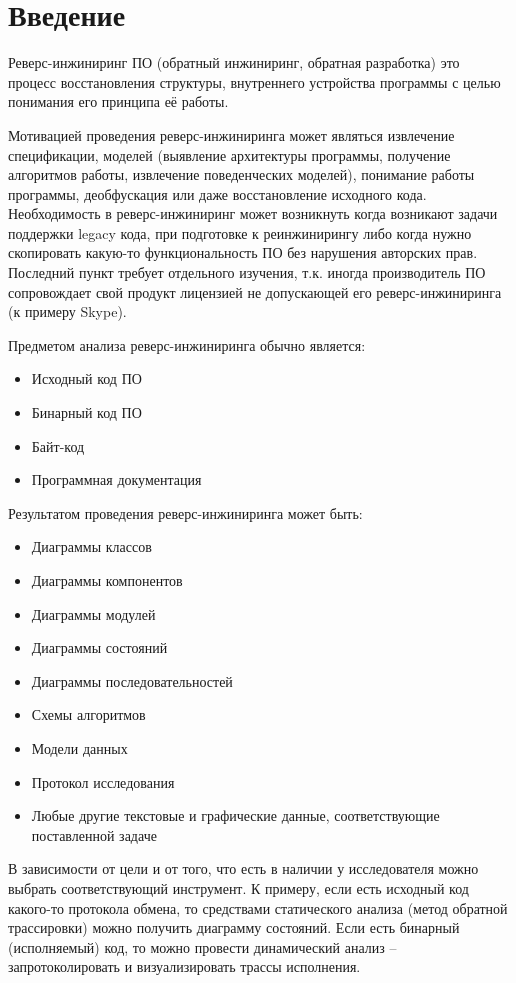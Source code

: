 \newpage
\section*{Введение}

Реверс-инжиниринг ПО (обратный инжиниринг, обратная разработка) это процесс восстановления структуры, внутреннего устройства программы с целью понимания его принципа её работы.

Мотивацией проведения реверс-инжиниринга может являться извлечение спецификации, моделей (выявление архитектуры программы, получение алгоритмов работы, извлечение поведенческих моделей), понимание работы программы, деобфускация или даже восстановление исходного кода. Необходимость в реверс-инжиниринг может возникнуть когда возникают задачи поддержки legacy кода, при подготовке к реинжинирингу либо когда нужно скопировать какую-то функциональность ПО без нарушения авторских прав. Последний пункт требует отдельного изучения, т.к. иногда производитель ПО сопровождает свой продукт лицензией не допускающей его реверс-инжиниринга (к примеру Skype).

Предметом анализа реверс-инжиниринга обычно является:
\begin{itemize}
\item Исходный код ПО
\item Бинарный код ПО
\item Байт-код
\item Программная документация
\end{itemize}

Результатом проведения реверс-инжиниринга может быть:
\begin{itemize}
\item Диаграммы классов
\item Диаграммы компонентов
\item Диаграммы модулей
\item Диаграммы состояний
\item Диаграммы последовательностей
\item Схемы алгоритмов
\item Модели данных
\item Протокол исследования
\item Любые другие текстовые и графические данные, соответствующие поставленной задаче
\end{itemize}

В зависимости от цели и от того, что есть в наличии у исследователя можно выбрать соответствующий инструмент. К примеру, если есть исходный код какого-то протокола обмена, то средствами статического анализа (метод обратной трассировки) можно получить диаграмму состояний. Если есть бинарный (исполняемый) код, то можно провести динамический анализ -- запротоколировать и визуализировать трассы исполнения.

